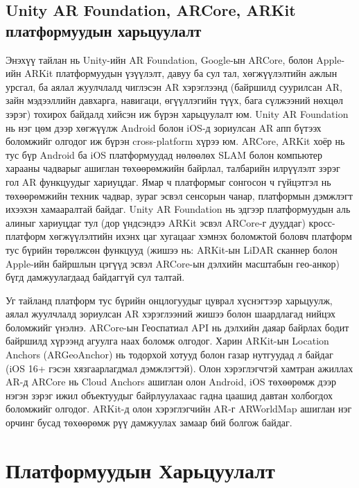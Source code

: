 \subsection{Unity AR Foundation, ARCore, ARKit платформуудын харьцуулалт}
\begin{sloppy}

Энэхүү тайлан нь Unity-ийн AR Foundation, Google-ын ARCore, болон Apple-ийн ARKit платформуудын үзүүлэлт, давуу ба сул тал, хөгжүүлэлтийн ажлын урсгал, ба аялал жуулчлалд чиглэсэн AR хэрэглээнд (байршилд суурилсан AR, зайн мэдээллийн давхарга, навигаци, өгүүллэгийн түүх, бага сүлжээний нөхцөл зэрэг) тохирох байдалд хийсэн иж бүрэн харьцуулалт юм. Unity AR Foundation нь нэг цөм дээр хөгжүүлж Android болон iOS-д зориулсан AR апп бүтээх боломжийг олгодог иж бүрэн cross-platform хүрээ юм. ARCore, ARKit хоёр нь тус бүр Android ба iOS платформуудад нөлөөлөх SLAM болон компьютер харааны чадварыг ашиглан төхөөрөмжийн байрлал, талбарийн илрүүлэлт зэрэг гол AR функцуудыг хариуцдаг. Ямар ч платформыг сонгосон ч гүйцэтгэл нь төхөөрөмжийн техник чадвар, зураг эсвэл сенсорын чанар, платформын дэмжлэгт ихээхэн хамааралтай байдаг. Unity AR Foundation нь эдгээр платформуудын аль алиныг хариуцдаг тул (дор үндсэндээ ARKit эсвэл ARCore-г дууддаг) кросс-платформ хөгжүүлэлтийн ихэнх цаг хугацааг хэмнэх боломжтой боловч платформ тус бүрийн төрөлжсөн функцууд (жишээ нь: ARKit-ын LiDAR сканнер болон Apple-ийн байршлын цэгүүд эсвэл ARCore-ын дэлхийн масштабын гео-анкор) бүгд дамжуулагдаад байдаггүй сул талтай.

Уг тайланд платформ тус бүрийн онцлогуудыг цуврал хүснэгтээр харьцуулж, аялал жуулчлалд зориулсан AR хэрэглээний жишээ болон шаардлагад нийцэх боломжийг үнэлнэ. ARCore-ын Геоспатиал API нь дэлхийн даяар байрлах бодит байршилд хүрээнд агуулга наах боломж олгодог. Харин ARKit-ын Location Anchors (ARGeoAnchor) нь тодорхой хотууд болон газар нутгуудад л байдаг (iOS 16+ гэсэн хязгаарлагдмал дэмжлэгтэй). Олон хэрэглэгчтэй хамтран ажиллах AR-д ARCore нь Cloud Anchors ашиглан олон Android, iOS төхөөрөмж дээр нэгэн зэрэг ижил объектуудыг байрлуулахаас гадна цаашид давтан холбогдох боломжийг олгодог. ARKit-д олон хэрэглэгчийн AR-г ARWorldMap ашиглан нэг орчинг бусад төхөөрөмж рүү дамжуулах замаар бий болгож байдаг.

\section{Платформуудын Харьцуулалт}


\end{sloppy}
